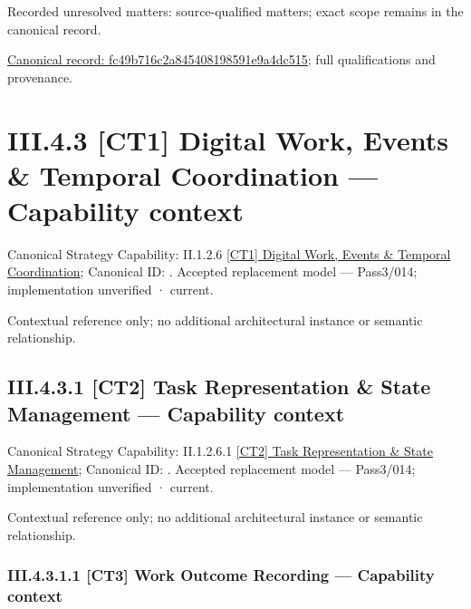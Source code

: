 {\small Recorded unresolved matters: source-qualified matters; exact scope remains in the canonical record.}\par
{\footnotesize \href{../../../../../../../../continuum/business/business-function/fc49b716c2a845408198591e9a4dc515.md}{Canonical record: fc49b716c2a845408198591e9a4dc515}; full qualifications and provenance.}\par
\section*{III.4.3 [CT1] Digital Work, Events \& Temporal Coordination — Capability context}
\label{navigation:III.4.3}

{\small Canonical Strategy Capability: II.1.2.6 \hyperref[element:9c899a650a334f068266147a824bcd55]{[CT1] Digital Work, Events \& Temporal Coordination}; Canonical ID: \texttt{}. Accepted replacement model — Pass3/014; implementation unverified · current.}\par
Contextual reference only; no additional architectural instance or semantic relationship.\par
\subsection*{III.4.3.1 [CT2] Task Representation \& State Management — Capability context}
\label{navigation:III.4.3.1}

{\small Canonical Strategy Capability: II.1.2.6.1 \hyperref[element:2238e574fb5345e1b8ecb4be42cf413c]{[CT2] Task Representation \& State Management}; Canonical ID: \texttt{}. Accepted replacement model — Pass3/014; implementation unverified · current.}\par
Contextual reference only; no additional architectural instance or semantic relationship.\par
\subsubsection*{III.4.3.1.1 [CT3] Work Outcome Recording — Capability context}
\label{navigation:III.4.3.1.1}

